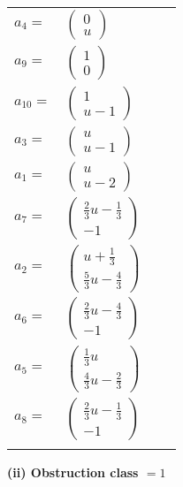 \documentclass[1p]{elsarticle_modified}
\theoremstyle{definition}
\begin{document}
\begin{tabular}{m{7pt} m{180pt} m{7pt} m{180pt} }
\flushright $a_{4}=$&$\begin{pmatrix}0\\u\end{pmatrix}$ \\
\flushright $a_{9}=$&$\begin{pmatrix}1\\0\end{pmatrix}$ \\
\flushright $a_{10}=$&$\begin{pmatrix}1\\u-1\end{pmatrix}$ \\
\flushright $a_{3}=$&$\begin{pmatrix}u\\u-1\end{pmatrix}$ \\
\flushright $a_{1}=$&$\begin{pmatrix}u\\u-2\end{pmatrix}$ \\
\flushright $a_{7}=$&$\begin{pmatrix}\frac{2}{3} u-\frac{1}{3}\\-1\end{pmatrix}$ \\
\flushright $a_{2}=$&$\begin{pmatrix}u+\frac{1}{3}\\\frac{5}{3} u-\frac{4}{3}\end{pmatrix}$ \\
\flushright $a_{6}=$&$\begin{pmatrix}\frac{2}{3} u-\frac{4}{3}\\-1\end{pmatrix}$ \\
\flushright $a_{5}=$&$\begin{pmatrix}\frac{1}{3} u\\\frac{4}{3} u-\frac{2}{3}\end{pmatrix}$ \\
\flushright $a_{8}=$&$\begin{pmatrix}\frac{2}{3} u-\frac{1}{3}\\-1\end{pmatrix}$\\&\end{tabular}
\flushleft \textbf{(ii) Obstruction class $= 1$}\\~\\
\end{document}
